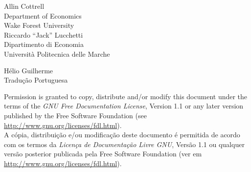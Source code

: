 \documentclass[oneside,portuges]{book}
\begin{document}
\VerbatimFootnotes

\setlength{\parindent}{0pt}
\setlength{\parskip}{1ex}



\thispagestyle{empty}

\begin{center}



{\large \sffamily
Allin Cottrell\\
Department of Economics\\
Wake Forest University\\

\vspace{20pt}
Riccardo ``Jack'' Lucchetti\\
Dipartimento di Economia\\
Università Politecnica delle Marche\\

\vspace{20pt}

Hélio Guilherme\\
Tradução Portuguesa\\
\vspace{20pt}

}

\end{center}
\clearpage


\thispagestyle{empty}


\vspace*{2in}

Permission is granted to copy, distribute and/or modify this document
under the terms of the \emph{GNU Free Documentation License}, Version
1.1 or any later version published by the Free Software Foundation
(see \url{http://www.gnu.org/licenses/fdl.html}).\\

\vspace{20pt}
A cópia, distribuição e/ou modificação deste documento é permitida de
acordo com os termos da \emph{Licença de Documentação Livre GNU},
Versão 1.1 ou qualquer versão posterior publicada pela Free Software
Foundation (ver em \url{http://www.gnu.org/licenses/fdl.html}).

\clearpage


\pagestyle{headings}

\tableofcontents

\clearpage
{}







\clearpage

\end{document}
